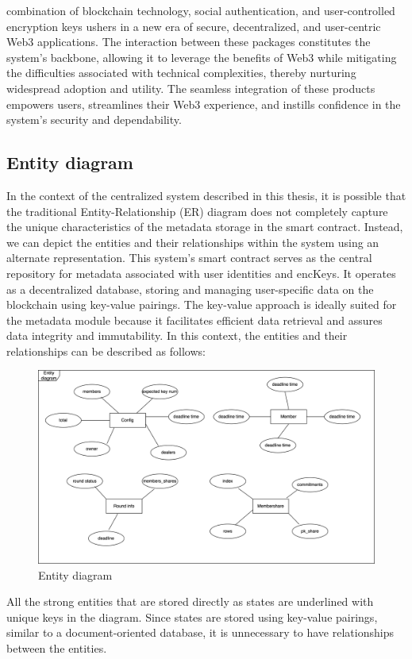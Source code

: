 \documentclass[../Main.tex]{subfiles}
\begin{document}
combination of blockchain technology, social authentication, and user-controlled encryption keys ushers in a new era of secure, decentralized, and user-centric Web3 applications. The interaction between these packages constitutes the system's backbone, allowing it to leverage the benefits of Web3 while mitigating the difficulties associated with technical complexities, thereby nurturing widespread adoption and utility. The seamless integration of these products empowers users, streamlines their Web3 experience, and instills confidence in the system's security and dependability.

\subsection{Entity diagram}
In the context of the centralized system described in this thesis, it is possible that the traditional Entity-Relationship (ER) diagram does not completely capture the unique characteristics of the metadata storage in the smart contract. Instead, we can depict the entities and their relationships within the system using an alternate representation. This system's smart contract serves as the central repository for metadata associated with user identities and encKeys. It operates as a decentralized database, storing and managing user-specific data on the blockchain using key-value pairings. The key-value approach is ideally suited for the metadata module because it facilitates efficient data retrieval and assures data integrity and immutability. In this context, the entities and their relationships can be described as follows:
\begin{figure}[H]
 \centering
 \includegraphics[scale=0.13]{Figure/entity-diagram.png}
 \caption{Entity diagram}
    \label{fig:entity-diagram}
\end{figure}
All the strong entities that are stored directly as states are underlined with unique keys in the diagram. Since states are stored using key-value pairings, similar to a document-oriented database, it is unnecessary to have relationships between the entities.\\
\end{document}
